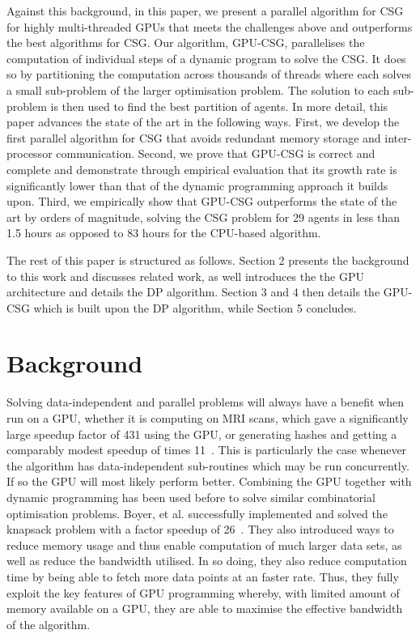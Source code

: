 \documentclass{llncs}
\begin{document}
Against this background, in this paper, we present a parallel algorithm for CSG for highly multi-threaded GPUs that meets the challenges above and outperforms the best algorithms for CSG. Our algorithm, GPU-CSG, parallelises the computation of individual steps of a dynamic program to solve the CSG. It does so by partitioning the computation across thousands of threads where each solves a small sub-problem of the larger optimisation problem. The solution to each sub-problem is then used to find the best partition of agents. In more detail, this paper advances the state of the art in the following ways. First, we develop the first parallel  algorithm for CSG that avoids redundant memory storage and inter-processor communication. Second, we prove that GPU-CSG is correct and complete and demonstrate through empirical evaluation that its growth rate is significantly lower than that of the dynamic programming approach it builds upon. Third, we empirically show that GPU-CSG outperforms the state of the art by orders of magnitude, solving the CSG problem for 29 agents in less than 1.5 hours as opposed to 83 hours for the CPU-based algorithm.

The rest of this paper is structured as follows. Section 2 presents the
background to this work and discusses related work, as well introduces the
the GPU architecture and details the DP algorithm. Section 3 and 4 then details the GPU-CSG which is built upon the DP algorithm,
while Section 5 concludes.

\section{Background}
Solving data-independent and parallel problems will always have a benefit when run on a GPU, 
whether it is computing on MRI scans, which gave a significantly large speedup factor of 431 using the GPU, or generating hashes and getting a comparably modest speedup of times 11~\cite{ryoo2008optimization}.  This is particularly the case whenever the algorithm has data-independent sub-routines which may be run concurrently. If so the GPU will most likely perform better. Combining the GPU together with dynamic programming has been used before to solve similar combinatorial optimisation problems.  Boyer, et al. successfully implemented and solved the knapsack problem with a factor speedup of 26~\cite{boyer2012solving}.  They also introduced ways to reduce memory usage and thus enable computation of much larger data sets, as well as reduce the  bandwidth utilised. In so doing, they also reduce computation time by being able to fetch more data points at an faster rate. Thus, they fully exploit the key features of GPU programming whereby, with limited amount of memory available on a GPU,  they are able to maximise the effective bandwidth of the algorithm.
\end{document}
